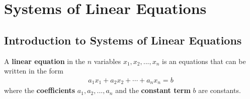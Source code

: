 \documentclass{article}
\begin{document}
\section{Systems of Linear Equations}
\subsection{Introduction to Systems of Linear Equations}
\begin{definition}
    A \textbf{linear equation} in the $n$ variables $x_1, x_2, ..., x_n$ is an equations that can be written in the form
    \begin{gather*}
        a_1x_1+a_2x_2+\cdots+a_nx_n=b
    \end{gather*}
    where the \textbf{coefficients} $a_1, a_2, ..., a_n$ and the \textbf{constant term} $b$ are constants.
\end{definition}
\end{document}
